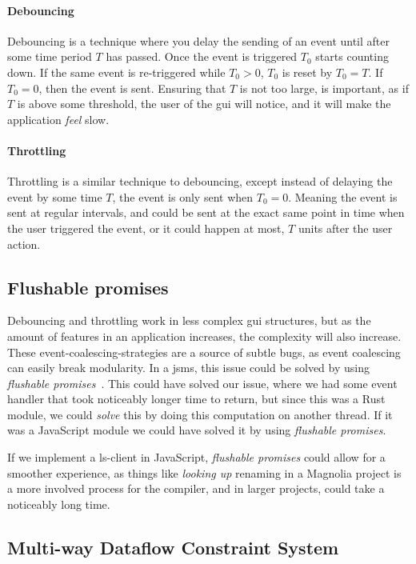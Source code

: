 \paragraph{Debouncing} Debouncing is a technique where you delay the sending of
an event until after some time period $T$ has passed. Once the event is triggered
$T_0$ starts counting down. If the same event is re-triggered while $T_0 > 0$,
$T_0$ is reset by $T_0 = T$. If $T_0 = 0$, then the event is sent. Ensuring that
$T$ is not too large, is important, as if $T$ is above some threshold, the user
of the \gls*{gui} will notice, and it will make the application \textit{feel}
slow.

\paragraph{Throttling} Throttling is a similar technique to debouncing, except
instead of delaying the event by some time $T$, the event is only sent when
$T_0 = 0$. Meaning the event is sent at regular intervals, and could be sent at
the exact same point in time when the user triggered the event, or it could
happen at most, $T$ units after the user action.


\subsection{Flushable promises}

Debouncing and throttling work in less complex \gls*{gui} structures, but as the
amount of features in an application increases, the complexity will also
increase. These event-coalescing-strategies are a source of subtle bugs, as
event coalescing can easily break modularity. In a \gls*{jsms}, this issue could
be solved by using \textit{flushable promises}~\cite{flush}. This could have
solved our issue, where we had some event handler that took noticeably longer
time to return, but since this was a Rust module, we could \textit{solve} this
by doing this computation on another thread. If it was a JavaScript module we
could have solved it by using \textit{flushable promises}.

If we implement a \gls*{ls}-client in JavaScript, \textit{flushable promises}
could allow for a smoother experience, as things like \textit{looking up}
renaming in a Magnolia project is a more involved process for the compiler,
and in larger projects, could take a noticeably long time.


\subsection{Multi-way Dataflow Constraint System}

